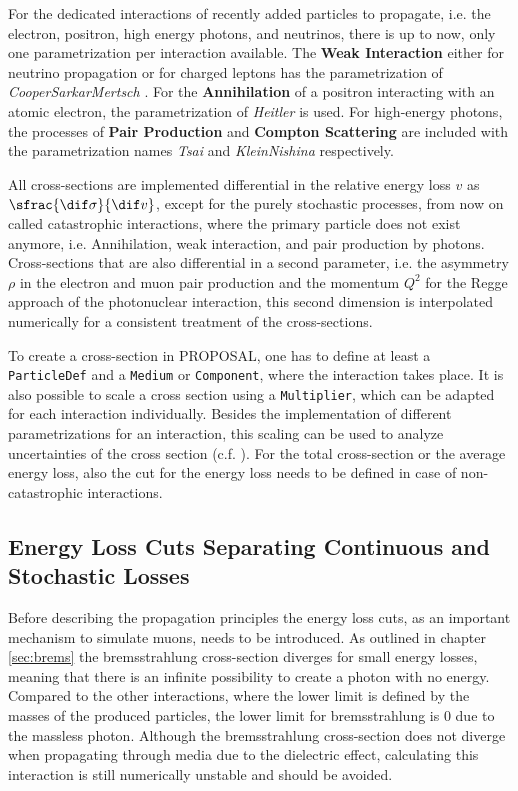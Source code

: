 For the dedicated interactions of recently added particles to propagate, i.e. the electron, positron, high energy photons, and neutrinos, there is up to now, only one parametrization per interaction available.
The \textbf{Weak Interaction} either for neutrino propagation or for charged leptons has the parametrization of \textit{CooperSarkarMertsch} \cite{CSMS11NuXsection}.
For the \textbf{Annihilation} of a positron interacting with an atomic electron, the parametrization of \textit{Heitler} \cite{Heitler54} is used.
For high-energy photons, the processes of \textbf{Pair Production} and \textbf{Compton Scattering} are included with the parametrization names \textit{Tsai} and \textit{KleinNishina} respectively.

All cross-sections are implemented differential in the relative energy loss $v$ as $\sfrac{\dif \sigma}{\dif v}$, except for the purely stochastic processes, from now on called catastrophic interactions, where the primary particle does not exist anymore, i.e. Annihilation, weak interaction, and pair production by photons.
Cross-sections that are also differential in a second parameter, i.e. the asymmetry $\rho$ in the electron and muon pair production and the momentum $Q^2$ for the Regge approach of the photonuclear interaction, this second dimension is interpolated numerically for a consistent treatment of the cross-sections.

To create a cross-section in PROPOSAL, one has to define at least a \texttt{ParticleDef} and a \texttt{Medium} or \texttt{Component}, where the interaction takes place.
It is also possible to scale a cross section using a \texttt{Multiplier}, which can be adapted for each interaction individually.
Besides the implementation of different parametrizations for an interaction, this scaling can be used to analyze uncertainties of the cross section (c.f. ).
For the total cross-section or the average energy loss, also the cut for the energy loss needs to be defined in case of non-catastrophic interactions.

%

\subsection{Energy Loss Cuts Separating Continuous and Stochastic Losses} \label{sec:ecuts}

Before describing the propagation principles the energy loss cuts, as an important mechanism to simulate muons, needs to be introduced.
As outlined in chapter \ref{sec:brems} the bremsstrahlung cross-section diverges for small energy losses, meaning that there is an infinite possibility to create a photon with no energy.
Compared to the other interactions, where the lower limit is defined by the masses of the produced particles, the lower limit for bremsstrahlung is \num{0} due to the massless photon.
Although the bremsstrahlung cross-section does not diverge when propagating through media due to the dielectric effect, calculating this interaction is still numerically unstable and should be avoided.

